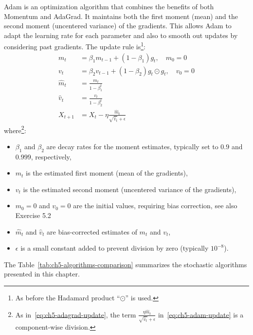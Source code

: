 Adam is an optimization algorithm that combines the benefits of both Momentum and AdaGrad. It maintains both the first moment (mean) and the second moment (uncentered variance) of the gradients. This allows Adam to adapt the learning rate for each parameter and also to smooth out updates by considering past gradients. The update rule is\footnote{As before the Hadamard product ``$\odot$'' is used.}:
\begin{align}
m_t &= \beta_1 m_{t-1} + (1 - \beta_1) g_t, \quad m_0 = 0 \label{eq:ch5-adam-m}\\
v_t &= \beta_2 v_{t-1} + (1 - \beta_2) g_t \odot g_t, \quad v_0 = 0 \label{eq:ch5-adam-v}\\
\hat{m}_t &= \frac{m_t}{1 - \beta_1^t} \label{eq:ch5-adam-mhat}\\
\hat{v}_t &= \frac{v_t}{1 - \beta_2^t} \label{eq:ch5-adam-vhat}\\
X_{t+1} &= X_t - \eta \frac{\hat{m}_t}{\sqrt{\hat{v}_t} + \epsilon} \label{eq:ch5-adam-update}
\end{align}
where\footnote{As in~\eqref{eq:ch5-adagrad-update}, the term $\frac{\eta \hat{m}_t}{\sqrt{\hat{v}_t}+\epsilon}$ in~\eqref{eq:ch5-adam-update} is a component-wise division.}:
\begin{itemize}
    \item $\beta_1$ and $\beta_2$ are decay rates for the moment estimates, typically set to $0.9$ and $0.999$, respectively,
    \item $m_t$ is the estimated first moment (mean of the gradients),
    \item $v_t$ is the estimated second moment (uncentered variance of the gradients),
    \item $m_0 = 0$ and $v_0 = 0$ are the initial values, requiring bias correction, see also Exercise 5.2
    \item $\hat{m}_t$ and $\hat{v}_t$ are bias-corrected estimates of $m_t$ and $v_t$,
    \item $\epsilon$ is a small constant added to prevent division by zero (typically $10^{-8}$).
\end{itemize}

The Table~\ref{tab:ch5-algorithms-comparison} summarizes the stochastic algorithms presented in this chapter.


